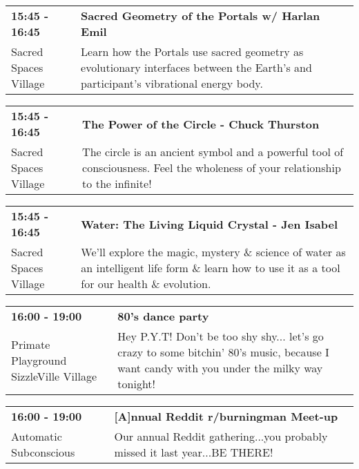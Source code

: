 \begin{tabular}{ p{1in} p{2.2in} }
    \textbf{15:45 - 16:45} & \textbf{Sacred Geometry of the Portals w/ Harlan Emil} \\
    Sacred Spaces Village \newline  & Learn how the Portals use sacred geometry as evolutionary interfaces between the Earth's and participant's vibrational energy body. \\
    \hline 
\end{tabular}
    
\begin{tabular}{ p{1in} p{2.2in} }
    \textbf{15:45 - 16:45} & \textbf{The Power of the Circle - Chuck Thurston} \\
    Sacred Spaces Village \newline  & The circle is an ancient symbol and a powerful tool of consciousness. Feel the wholeness of your relationship to the infinite! \\
    \hline 
\end{tabular}
    
\begin{tabular}{ p{1in} p{2.2in} }
    \textbf{15:45 - 16:45} & \textbf{Water: The Living Liquid Crystal - Jen Isabel} \\
    Sacred Spaces Village \newline  & We'll explore the magic, mystery \& science of water as an intelligent life form \& learn how to use it as a tool for our health \& evolution. \\
    \hline 
\end{tabular}
    
\begin{tabular}{ p{1in} p{2.2in} }
    \textbf{16:00 - 19:00} & \textbf{80's dance party} \\
    Primate Playground \newline SizzleVille Village & Hey P.Y.T! Don't be too shy shy... let's go crazy to some bitchin' 80's music, because I want candy with you under the milky way tonight! \\
    \hline 
\end{tabular}
    
\begin{tabular}{ p{1in} p{2.2in} }
    \textbf{16:00 - 19:00} & \textbf{[A]nnual Reddit r/burningman Meet-up} \\
    Automatic Subconscious \newline  & Our annual Reddit gathering...you probably missed it last year...BE THERE! \\
    \hline 
\end{tabular}
    
